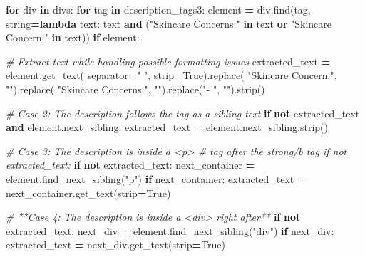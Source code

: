 \documentclass[
]{article}
\newenvironment{Shaded}{\begin{snugshade}}{\end{snugshade}}
\newcommand{\CommentTok}[1]{\textcolor[rgb]{0.56,0.35,0.01}{\textit{#1}}}
\newcommand{\ControlFlowTok}[1]{\textcolor[rgb]{0.13,0.29,0.53}{\textbf{#1}}}
\newcommand{\KeywordTok}[1]{\textcolor[rgb]{0.13,0.29,0.53}{\textbf{#1}}}
\newcommand{\NormalTok}[1]{#1}
\newcommand{\OperatorTok}[1]{\textcolor[rgb]{0.81,0.36,0.00}{\textbf{#1}}}
\newcommand{\StringTok}[1]{\textcolor[rgb]{0.31,0.60,0.02}{#1}}
\newcommand{\VariableTok}[1]{\textcolor[rgb]{0.00,0.00,0.00}{#1}}
\begin{document}
\begin{Shaded}
\begin{Highlighting}[]
          \ControlFlowTok{for}\NormalTok{ div }\KeywordTok{in}\NormalTok{ divs:}
            \ControlFlowTok{for}\NormalTok{ tag }\KeywordTok{in}\NormalTok{ description\_tags3:}
\NormalTok{              element }\OperatorTok{=}\NormalTok{ div.find(tag, string}\OperatorTok{=}\KeywordTok{lambda}\NormalTok{ text:}
\NormalTok{                text }\KeywordTok{and}\NormalTok{ (}\StringTok{"Skincare Concerns:"} \KeywordTok{in}\NormalTok{ text }\KeywordTok{or}
                \StringTok{"Skincare Concern:"} \KeywordTok{in}\NormalTok{ text))}
              \ControlFlowTok{if}\NormalTok{ element: }

                \CommentTok{\# Extract text while handling possible formatting issues}
\NormalTok{                extracted\_text }\OperatorTok{=}\NormalTok{ element.get\_text(}
\NormalTok{                  separator}\OperatorTok{=}\StringTok{" "}\NormalTok{, strip}\OperatorTok{=}\VariableTok{True}\NormalTok{).replace(}
                    \StringTok{"Skincare Concern:"}\NormalTok{, }\StringTok{""}\NormalTok{).replace(}
                      \StringTok{"Skincare Concerns:"}\NormalTok{, }\StringTok{""}\NormalTok{).replace(}\StringTok{"{-} "}\NormalTok{, }\StringTok{""}\NormalTok{).strip()}

                \CommentTok{\# Case 2: The description follows the tag as a sibling text}
                \ControlFlowTok{if} \KeywordTok{not}\NormalTok{ extracted\_text }\KeywordTok{and}\NormalTok{ element.next\_sibling:}
\NormalTok{                  extracted\_text }\OperatorTok{=}\NormalTok{ element.next\_sibling.strip()}
    
                \CommentTok{\# Case 3: The description is inside a \textasciigrave{}\textless{}p\textgreater{}\textasciigrave{}}
                \CommentTok{\# tag after the strong/b tag if not extracted\_text:}
                \ControlFlowTok{if} \KeywordTok{not}\NormalTok{ extracted\_text:}
\NormalTok{                  next\_container }\OperatorTok{=}\NormalTok{ element.find\_next\_sibling(}\StringTok{"p"}\NormalTok{)}
                  \ControlFlowTok{if}\NormalTok{ next\_container:}
\NormalTok{                    extracted\_text }\OperatorTok{=}\NormalTok{ next\_container.get\_text(strip}\OperatorTok{=}\VariableTok{True}\NormalTok{)}
                    
                \CommentTok{\# **Case 4: The description is inside a \textasciigrave{}\textless{}div\textgreater{}\textasciigrave{} right after**}
                \ControlFlowTok{if} \KeywordTok{not}\NormalTok{ extracted\_text:}
\NormalTok{                  next\_div }\OperatorTok{=}\NormalTok{ element.find\_next\_sibling(}\StringTok{"div"}\NormalTok{)}
                  \ControlFlowTok{if}\NormalTok{ next\_div:}
\NormalTok{                    extracted\_text }\OperatorTok{=}\NormalTok{ next\_div.get\_text(strip}\OperatorTok{=}\VariableTok{True}\NormalTok{)}


\end{Highlighting}
\end{Shaded}
\end{document}
